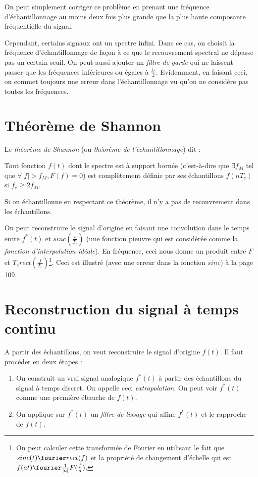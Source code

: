         On peut simplement corriger ce problème en prenant une fréquence d'échantillonnage au moins deux fois plus grande que la plus haute composante fréquentielle du signal.
        
        Cependant, certains signaux ont un spectre infini. Dans ce cas, on choisit la fréquence d'échantillonnage de façon à ce que le recouvrement spectral ne dépasse pas un certain seuil. On peut aussi ajouter un \textit{filtre de garde} qui ne laissent passer que les fréquences inférieures ou égales à $\frac{f_e}{2}$. Evidemment, en faisant ceci, on commet toujours une erreur dans l'échantillonnage vu qu'on ne considère pas toutes les fréquences.

    \section{Théorème de Shannon}
        Le \textit{théorème de Shannon} (ou \textit{théorème de l'échantillonnage}) dit :
        \begin{theorem}
            Tout fonction $f(t)$ dont le spectre est à support bornée (c'est-à-dire que $\exists f_M$ tel que $\forall |f| > f_M, F(f) = 0$) est complètement définie par ses échantillons $f(n T_e)$ si $f_e \geq 2f_M$.
        \end{theorem}

        Si on échantillonne en respectant ce théorème, il n'y a pas de recouvrement dans les échantillons.

        On peut reconstruire le signal d'origine en faisant une convolution dans le temps entre $f^*(t)$ et $sinc(\frac{t}{T_e})$ (une fonction pieuvre qui est considérée comme la \textit{fonction d'interpolation idéale}). En fréquence, ceci nous donne un produit entre $F$ et $T_e rect(\frac{f}{T_e})$\footnote{On peut calculer cette transformée de Fourier en utilisant le fait que $sinc(t) \fourier rect(f)$ et la propriété de changement d'échelle qui est $f(at) \fourier \frac{1}{|a|}F(\frac{f}{a})$.}. Ceci est illustré (avec une erreur dans la fonction $sinc$) à la page 109.

    \section{Reconstruction du signal à temps continu}
        A partir des échantillons, on veut reconstruire le signal d'origine $f(t)$. Il faut procéder en deux étapes :
        \begin{enumerate}
            \item On construit un vrai signal analogique $f^*(t)$ à partir des échantillons du signal à temps discret. On appelle ceci \textit{extrapolation}. On peut voir $f^*(t)$ comme une première ébauche de $f(t)$.
            \item On applique sur $f^*(t)$ un \textit{filtre de lissage} qui affine $f^*(t)$ et le rapproche de $f(t)$.
        \end{enumerate}

